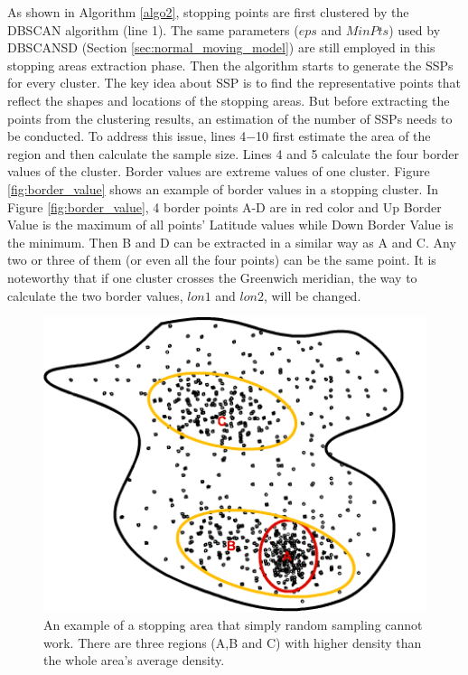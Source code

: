 \documentclass[12pt,glossary]{dalcsthesis}
\begin{document}
As shown in Algorithm \ref{algo2}, stopping points are first clustered by the DBSCAN \cite{DBScan96} algorithm (line 1). The same parameters ($eps$ and $MinPts$) used by DBSCANSD (Section \ref{sec:normal_moving_model}) are still employed in this stopping areas extraction phase. Then the algorithm starts to generate the SSPs for every cluster. The key idea about SSP is to find the representative points that reflect the shapes and locations of the stopping areas. But before extracting the points from the clustering results, an estimation of the number of SSPs needs to be conducted. To address this issue,  lines 4$-$10 first estimate the area of the region and then calculate the sample size. Lines 4 and 5 calculate the four border values of the cluster. Border values are extreme values of one cluster. Figure \ref{fig:border_value} shows an example of border values in a stopping cluster. In Figure \ref{fig:border_value}, 4 border points A-D are in red color and Up Border Value is the maximum of all points' Latitude values while Down Border Value is the minimum. Then B and D can be extracted in a similar way as A and C. Any two or three of them (or even all the four points) can be the same point. It is noteworthy that if one cluster crosses the Greenwich meridian, the way to calculate the two border values, $lon1$ and $lon2$, will be changed. 

\begin{figure}[!htb]
\centering
\includegraphics[width=4.5in]{stopExample.png}
\caption{An example of a stopping area that simply random sampling cannot work. There are three regions (A,B and C) with higher density than the whole area's average density.}
\label{fig:stopping_area}
\end{figure}
\end{document}
